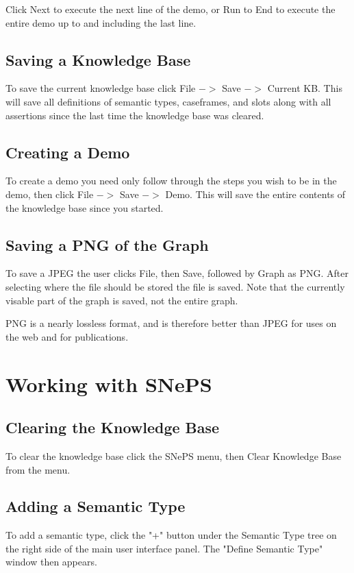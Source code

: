 \documentclass[10pt]{article}
\begin{document}
Click Next to execute the next line of the demo, or Run to End to execute the entire demo up to and including the last line.

\subsection{Saving a Knowledge Base}
To save the current knowledge base click File $->$ Save $->$ Current KB. This will save all definitions of semantic types, caseframes, and slots along with all assertions since the last time the knowledge base was cleared.

\subsection{Creating a Demo}
To create a demo you need only follow through the steps you wish to be in the demo, then click File $->$ Save $->$ Demo. This will save the entire contents of the knowledge base since you started.

\subsection{Saving a PNG of the Graph}
To save a JPEG the user clicks File, then Save, followed by Graph as PNG. After selecting where the file should be stored the file is saved. Note that the currently visable part of the graph is saved, not the entire graph.

PNG is a nearly lossless format, and is therefore better than JPEG for uses on the web and for publications.

\section{Working with SNePS}
\subsection{Clearing the Knowledge Base}
To clear the knowledge base click the SNePS menu, then Clear Knowledge Base from the menu.

\subsection{Adding a Semantic Type}
To add a semantic type, click the "+" button under the Semantic Type tree on the right side of the main user interface panel. The "Define Semantic Type" window then appears.
\end{document}
